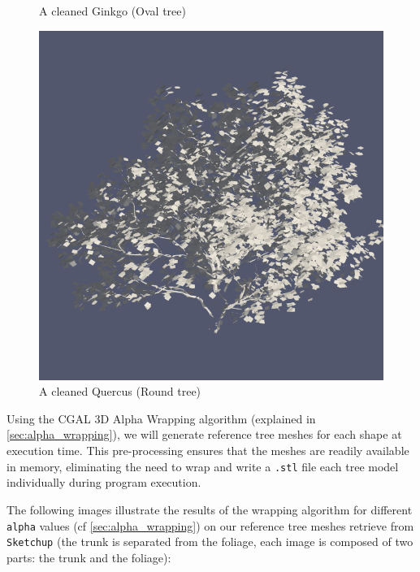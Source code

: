 \documentclass[12pt]{article}
\begin{document}
\begin{figure}[H]
\begin{minipage}{0.30\textwidth}
        \caption{A cleaned Ginkgo (Oval tree)}
    \end{minipage}
    \begin{minipage}{0.30\textwidth}
        \centering
        \includegraphics[width=1\textwidth]{images/tree-quercus.png}
        \caption{A cleaned Quercus (Round tree)}
    \end{minipage}
\end{figure}

Using the CGAL 3D Alpha Wrapping algorithm (explained in \autoref{sec:alpha_wrapping}), we will generate reference tree
meshes for each shape at execution time. This pre-processing ensures
that the meshes are readily available in memory, eliminating the need to wrap and
write a \texttt{.stl} file each tree model individually during program execution.


The following images illustrate the results of the wrapping algorithm for different
\texttt{alpha} values (cf \autoref{sec:alpha_wrapping}) on our reference tree meshes
 retrieve from \texttt{Sketchup}
(the trunk is separated from the foliage, each image is composed of two parts: 
the trunk and the foliage):
\end{document}

